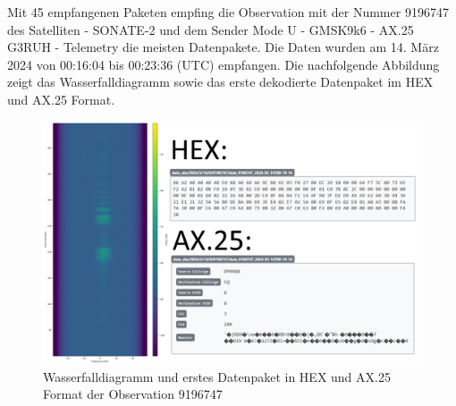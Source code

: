 Mit 45 empfangenen Paketen empfing die Observation mit der Nummer 9196747 des Satelliten  - SONATE-2\grqq{}  und dem Sender \glqq Mode U - GMSK9k6 - AX.25 G3RUH - Telemetry\grqq{} die meisten Datenpakete. Die Daten wurden am 14. März 2024 von 00:16:04 bis 00:23:36 (UTC) empfangen. Die nachfolgende Abbildung zeigt das Wasserfalldiagramm sowie das erste dekodierte Datenpaket im HEX und AX.25 Format.

\begin{figure} [H]
	\centering
	\includegraphics[width=\linewidth]{../ref/qha_successfull_operation.png}
	\caption{Wasserfalldiagramm und erstes Datenpaket in HEX und AX.25 Format der Observation 9196747 \cite{noauthor_satnogs_qfh_observation_nodate}}
	\label{fig:qha_successfull_observation}
\end{figure}



